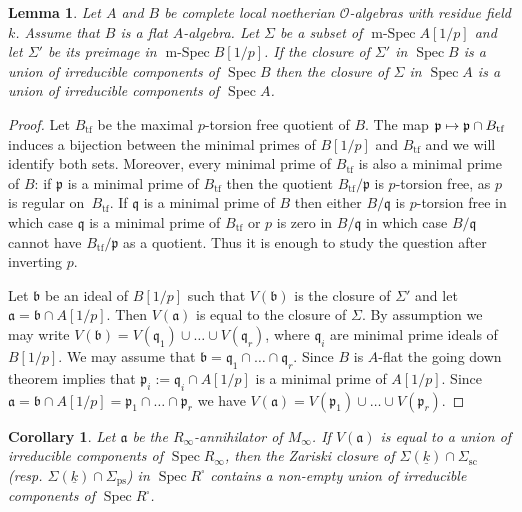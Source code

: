 \documentclass[11pt]{article}
\let\mathcal\mathscr
\newcommand\mto{\mathchoice{\longmapsto}{\mapsto}{\mapsto}{\mapsto}}
\newcommand{\ssquare}{{\scriptscriptstyle\square}}
\newcommand{\rps}{\mathrm{ps}}
\newcommand{\rsc}{\mathrm{sc}}
\newtheorem{lem}[prop]{Lemma}
\newtheorem{cor}[prop]{Corollary}
\theoremstyle{definition}
\DeclareMathOperator{\Spec}{Spec}
\DeclareMathOperator{\mSpec}{m-Spec}
\newcommand{\cO}{\mathcal{O}}
\newcommand{\pp}{\mathfrak p}
\newcommand{\qq}{\mathfrak{q}}
\begin{document}
\begin{lem}\label{going_down} Let $A$ and $B$ be complete local noetherian $\cO$-algebras with residue field $k$. Assume that
$B$ is a flat $A$-algebra. Let $\Sigma$ be a subset of $\mSpec A[1/p]$ and let $\Sigma'$ be its preimage in
$\mSpec B[1/p]$. If the closure of $\Sigma'$ in $\Spec B$ is a union of irreducible components of $\Spec B$ then
the closure of $\Sigma$ in $\Spec A$ is a union of irreducible components of $\Spec A$.
\end{lem}

\begin{proof} Let $B_{\mathrm{tf}}$ be the maximal $p$-torsion free quotient of $B$. The map $\pp\mto \pp \cap B_{\mathrm{tf}}$ induces a bijection between the minimal primes of $B[1/p]$ and
$B_{\mathrm{tf}}$ and we will identify both sets. Moreover, every minimal prime of $B_{\mathrm{tf}}$
is also a minimal prime of $B$: if $\pp$ is a minimal prime of $B_{\mathrm{tf}}$ then the
quotient $B_{\mathrm{tf}}/\pp$ is $p$-torsion free, as $p$ is regular on~$B_{\mathrm{tf}}$. If $\qq$ is a minimal prime of $B$ then either $B/\qq$ is $p$-torsion free
in which case $\qq$ is a minimal prime of $B_{\mathrm{tf}}$ or $p$ is zero in $B/\qq$ in which case
$B/\qq$ cannot have $B_{\mathrm{tf}}/\pp$ as a quotient. Thus it is enough to study the question after inverting $p$.

Let $\mathfrak b$ be an ideal of $B[1/p]$ such that $V(\mathfrak b)$ is the closure of $\Sigma'$ and
let \hbox{$\mathfrak a= \mathfrak b \cap A[1/p]$}. Then $V(\mathfrak a)$ is equal to the closure of $\Sigma$. By assumption we may write
\hbox{$V(\mathfrak b)= V(\qq_1)\cup\ldots \cup V(\qq_r)$}, where $\qq_i$ are minimal prime ideals of $B[1/p]$. We may assume that
$\mathfrak b = \qq_1\cap \ldots \cap \qq_r$. Since $B$ is $A$-flat the going down theorem implies that $\pp_i:=\qq_i \cap A[1/p]$ is a minimal prime
of $A[1/p]$. Since $\mathfrak a= \mathfrak b \cap A[1/p]= \pp_1\cap \ldots \cap \pp_r$ we have $V(\mathfrak a)= V(\pp_1)\cup \ldots \cup V(\pp_r)$.
\end{proof}

\begin{cor}\label{local} Let $\mathfrak a$ be the $R_{\infty}$-annihilator of $M_{\infty}$. If $V(\mathfrak a)$ is equal to a union of irreducible components of $\Spec R_{\infty}$,
then the Zariski closure of $\Sigma(\underline{k}) \cap \Sigma_{\rsc}$ (resp. $\Sigma(\underline{k}) \cap \Sigma_{\rps}$) in $\Spec R^\ssquare$
contains a non-empty
union of irreducible components of $\Spec R^\ssquare$.
\end{cor}
\end{document}
